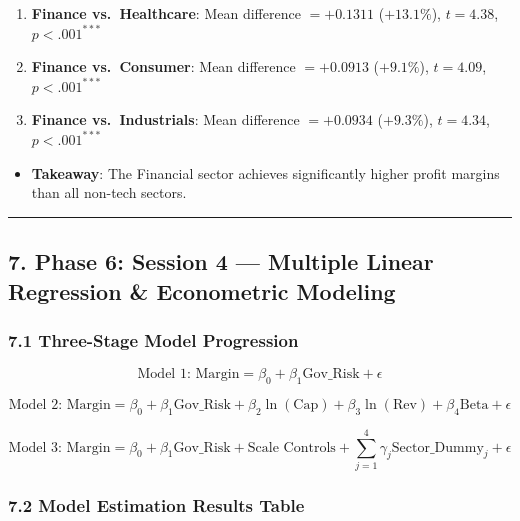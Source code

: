 \documentclass[
]{article}
\providecommand{\tightlist}{%
  \setlength{\itemsep}{0pt}\setlength{\parskip}{0pt}}
\begin{document}
\begin{enumerate}
\def\labelenumi{\arabic{enumi}.}
\tightlist
\item
  \textbf{Finance vs.~Healthcare}: Mean difference \(= +0.1311\)
  (\(+13.1\%\)), \(t = 4.38\), \(p < .001^{***}\)
\item
  \textbf{Finance vs.~Consumer}: Mean difference \(= +0.0913\)
  (\(+9.1\%\)), \(t = 4.09\), \(p < .001^{***}\)
\item
  \textbf{Finance vs.~Industrials}: Mean difference \(= +0.0934\)
  (\(+9.3\%\)), \(t = 4.34\), \(p < .001^{***}\)
\end{enumerate}

\begin{itemize}
\tightlist
\item
  \textbf{Takeaway}: The Financial sector achieves significantly higher
  profit margins than all non-tech sectors.
\end{itemize}

\begin{center}\rule{0.5\linewidth}{0.5pt}\end{center}

\subsection{7. Phase 6: Session 4 --- Multiple Linear Regression \&
Econometric
Modeling}\label{phase-6-session-4-multiple-linear-regression-econometric-modeling}

\subsubsection{7.1 Three-Stage Model
Progression}\label{three-stage-model-progression}

\[\text{Model 1: } \text{Margin} = \beta_0 + \beta_1 \text{Gov\_Risk} + \epsilon\]

\[\text{Model 2: } \text{Margin} = \beta_0 + \beta_1 \text{Gov\_Risk} + \beta_2 \ln(\text{Cap}) + \beta_3 \ln(\text{Rev}) + \beta_4 \text{Beta} + \epsilon\]

\[\text{Model 3: } \text{Margin} = \beta_0 + \beta_1 \text{Gov\_Risk} + \text{Scale Controls} + \sum_{j=1}^4 \gamma_j \text{Sector\_Dummy}_j + \epsilon\]

\subsubsection{7.2 Model Estimation Results
Table}\label{model-estimation-results-table}
\end{document}

